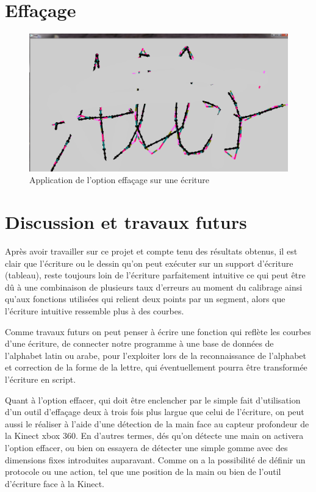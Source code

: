 \documentclass[12pt,a4paper,oneside]{book}
\begin{document}
	\section{Effaçage}
		\begin{figure}[H]
			\centering
			\includegraphics[scale=0.45]{images/ef1.png}
			\caption{ Application de l'option effaçage sur une écriture}
			
		\end{figure}
	
	\section{Discussion et travaux futurs}
	Après avoir travailler sur ce projet et compte tenu des résultats obtenus, il est clair que l'écriture ou le dessin qu'on peut exécuter sur un support d'écriture (tableau), reste toujours loin de l'écriture parfaitement intuitive ce qui peut être dû à une combinaison  de plusieurs taux d'erreurs au moment du calibrage ainsi qu'aux fonctions utilisées qui relient deux points par un segment, alors que l'écriture intuitive ressemble plus à des courbes.  
	
	Comme travaux futurs on peut penser à écrire une fonction qui reflète les courbes d'une écriture, de connecter notre programme à une base de données de l'alphabet latin ou arabe, pour l'exploiter lors de la reconnaissance de l'alphabet et correction de la forme de la lettre, qui éventuellement pourra être transformée l'écriture en script.
	
	Quant à l'option effacer, qui doit être enclencher par le simple fait d'utilisation d'un outil d'effaçage deux à trois fois plus largue que celui de l'écriture, on peut aussi le réaliser à l'aide d'une détection de la main face au capteur profondeur de la Kinect xbox 360. En d'autres termes, dés qu'on détecte une main on activera l'option effacer, ou bien on essayera de détecter une simple gomme avec des dimensions fixes introduites auparavant. Comme on a la possibilité de définir un protocole ou une action, tel que une position de la main ou bien de l'outil d'écriture face à la Kinect.%
	
\end{document}
